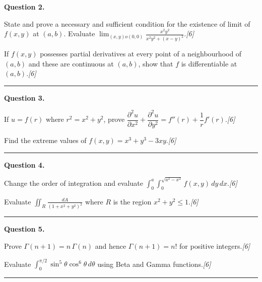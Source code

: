 \documentclass[11pt,a4paper]{article}
\newcommand{\pts}[1]{\hfill   \textit{[#1]}}
\begin{document}
\medskip


\noindent   \textbf{Question 2.}

\begin{parts}
  \item State and prove a necessary and sufficient condition for the existence of limit of $f(x,y)$ at $(a,b)$. Evaluate $\displaystyle\lim_{(x,y) o(0,0)}\frac{x^2y^2}{x^2y^2+(x-y)^2}$.\pts{6}
  \item If $f(x,y)$ possesses partial derivatives at every point of a neighbourhood of $(a,b)$ and these are continuous at $(a,b)$, show that $f$ is differentiable at $(a,b)$.\pts{6}
\end{parts}
\medskip\rule{\linewidth}{0.2pt}

\medskip


\noindent   \textbf{Question 3.}

\begin{parts}
  \item If $u=f(r)$ where $r^2=x^2+y^2$, prove $\dfrac{\partial^2 u}{\partial x^2}+\dfrac{\partial^2 u}{\partial y^2}=f''(r)+\dfrac{1}{r}f'(r)$.\pts{6}
  \item Find the extreme values of $f(x,y)=x^3+y^3-3xy$.\pts{6}
\end{parts}
\medskip\rule{\linewidth}{0.2pt}

\medskip


\noindent   \textbf{Question 4.}

\begin{parts}
  \item Change the order of integration and evaluate $\displaystyle\int_0^a\int_0^{\sqrt{a^2-x^2}}\!f(x,y)\,dy\,dx$.\pts{6}
  \item Evaluate $\displaystyle\iint_R\frac{dA}{(1+x^2+y^2)^2}$ where $R$ is the region $x^2+y^2\leq1$.\pts{6}
\end{parts}
\medskip\rule{\linewidth}{0.2pt}

\medskip


\noindent   \textbf{Question 5.}

\begin{parts}
  \item Prove $\Gamma(n+1)=n\,\Gamma(n)$ and hence $\Gamma(n+1)=n!$ for positive integers.\pts{6}
  \item Evaluate $\displaystyle\int_0^{\pi/2}\sin^5 \theta\cos^6 \theta\,d \theta$ using Beta and Gamma functions.\pts{6}
\end{parts}
\medskip\rule{\linewidth}{0.2pt}

\medskip
\end{document}
